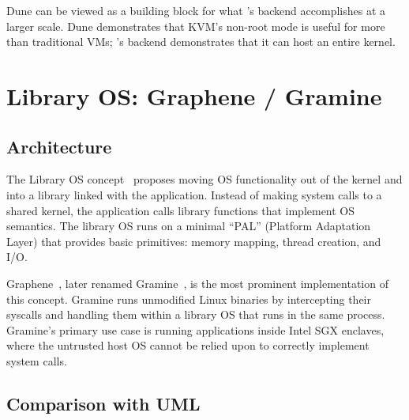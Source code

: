 Dune can be viewed as a building block for what \UML{}'s \KVMvTwo{}
backend accomplishes at a larger scale.  Dune demonstrates that
KVM's non-root mode is useful for more than traditional VMs; \UML{}'s
\KVMvTwo{} backend demonstrates that it can host an entire kernel.


\section{Library OS: Graphene / Gramine}
\label{sec:related-libos}

\subsection{Architecture}

The Library OS concept~\cite{porter2011} proposes moving OS
functionality out of the kernel and into a library linked with the
application.  Instead of making system calls to a shared kernel,
the application calls library functions that implement OS
semantics.  The library OS runs on a minimal ``PAL'' (Platform
Adaptation Layer) that provides basic primitives: memory mapping,
thread creation, and I/O.

Graphene~\cite{tsai2014}, later renamed Gramine~\cite{gramine},
is the most prominent implementation of this concept.  Gramine
runs unmodified Linux binaries by intercepting their syscalls and
handling them within a library OS that runs in the same process.
Gramine's primary use case is running applications inside Intel
SGX enclaves, where the untrusted host OS cannot be relied upon
to correctly implement system calls.

\subsection{Comparison with UML}

